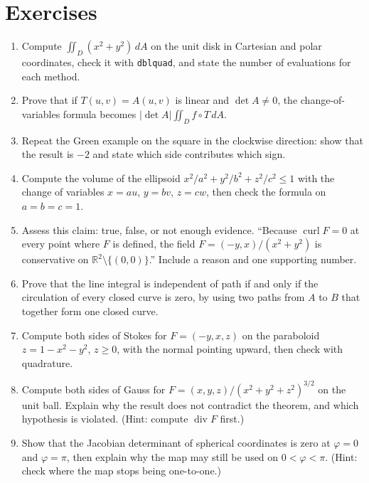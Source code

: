 \section{Exercises}
\begin{latihan}
\begin{enumerate}
\item Compute $\iint_{D}(x^{2}+y^{2})\,dA$ on the unit disk in Cartesian and polar coordinates, check it with \texttt{dblquad}, and state the number of evaluations for each method.

\item Prove that if $T(u,v)=A(u,v)$ is linear and $\det A\ne0$, the
change-of-variables formula becomes $|\det A|\iint_{D}f\circ T\,dA$.

\item Repeat the Green example on the square in the clockwise direction: show that the result is
$-2$ and state which side contributes which sign.

\item Compute the volume of the ellipsoid $x^{2}/a^{2}+y^{2}/b^{2}+z^{2}/c^{2}\le1$ with
the change of variables $x=au$, $y=bv$, $z=cw$, then check the formula on
$a=b=c=1$.

\item Assess this claim: true, false, or not enough evidence. ``Because
$\operatorname{curl}F=0$ at every point where $F$ is defined, the field
$F=(-y,x)/(x^{2}+y^{2})$ is conservative on
$\mathbb{R}^{2}\setminus\{(0,0)\}$.'' Include a reason and one supporting
number.

\item Prove that the line integral is independent of path if and only if the
circulation of every closed curve is zero, by using two paths from $A$ to
$B$ that together form one closed curve.

\item Compute both sides of Stokes for $F=(-y,x,z)$ on the paraboloid
$z=1-x^{2}-y^{2}$, $z\ge0$, with the normal pointing upward, then check
with quadrature.

\item Compute both sides of Gauss for $F=(x,y,z)/(x^{2}+y^{2}+z^{2})^{3/2}$ on the unit
ball. Explain why the result does not contradict the theorem, and
which hypothesis is violated. (Hint: compute $\operatorname{div}F$ first.)

\item Show that the Jacobian determinant of spherical coordinates is zero at $\varphi=0$ and
$\varphi=\pi$, then explain why the map may still be used on
$0<\varphi<\pi$. (Hint: check where the map stops being one-to-one.)
\end{enumerate}
\end{latihan}

